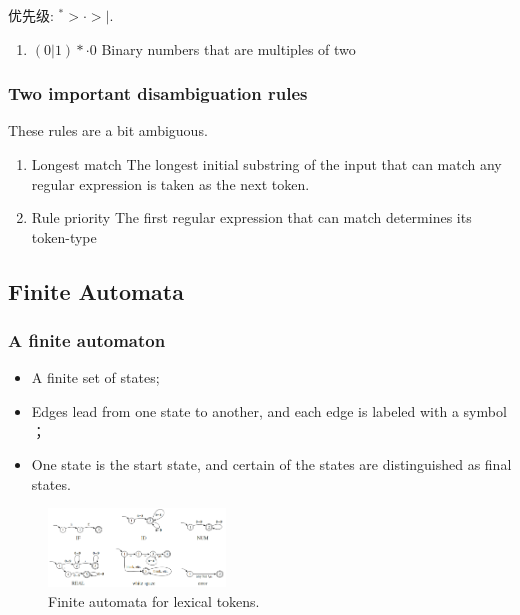 优先级: ${}^*> \cdot > |$.

\begin{example}\quad

    \begin{enumerate}
        \item $(0|1)*\cdot0$
        \subitem Binary numbers that are multiples of two
    \end{enumerate}
\end{example}

\subsubsection{Two important disambiguation rules}
These rules are a bit ambiguous.

\begin{enumerate}
    \item Longest match
    \subitem The longest initial substring of the input that can match any regular expression is taken as the next token.
    \item Rule priority
    \subitem The first regular expression that can match determines its token-type
\end{enumerate}

\subsection{Finite Automata}
\subsubsection{A finite automaton}
\begin{definition}\quad 
    \begin{itemize}
        \item A finite set of states;
        \item Edges lead from one state to another, and each edge is labeled with a symbol ；
        \item One state is the start state, and certain of the states are distinguished as final states.
    \end{itemize}
\end{definition}

\begin{figure}[!htb]
    \centering
    \includegraphics[width=0.42\textwidth]{pic/CP2/Finite automata for lexical tokens.}
    \caption{Finite automata for lexical tokens.}
\end{figure}

